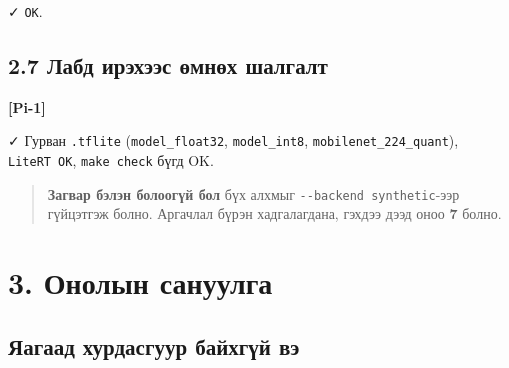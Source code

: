 ✓ \texttt{OK}.

\hypertarget{ux43bux430ux431ux434-ux438ux440ux44dux445ux44dux44dux441-ux4e9ux43cux43dux4e9ux445-ux448ux430ux43bux433ux430ux43bux442}{%
\subsection{2.7 Лабд ирэхээс өмнөх шалгалт}\label{ux43bux430ux431ux434-ux438ux440ux44dux445ux44dux44dux441-ux4e9ux43cux43dux4e9ux445-ux448ux430ux43bux433ux430ux43bux442}}

\textbf{{[}Pi-1{]}}

\begin{Shaded}
\begin{Highlighting}[]
  
\KeywordTok{\&\&} \KeywordTok{\&\&} \KeywordTok{\&\&} 
\end{Highlighting}
\end{Shaded}

✓ Гурван \texttt{.tflite} (\texttt{model\_float32}, \texttt{model\_int8}, \texttt{mobilenet\_\allowbreak{}224\_\allowbreak{}quant}), \texttt{LiteRT\ OK}, \texttt{make\ check} бүгд OK.

\begin{quote}
\textbf{Загвар бэлэн болоогүй бол} бүх алхмыг \texttt{-\/\allowbreak{}-backend\ synthetic}-ээр гүйцэтгэж болно. Аргачлал бүрэн хадгалагдана, гэхдээ дээд оноо \textbf{7} болно.
\end{quote}

\hypertarget{ux43eux43dux43eux43bux44bux43d-ux441ux430ux43dux443ux443ux43bux433ux430}{%
\section{3. Онолын сануулга}\label{ux43eux43dux43eux43bux44bux43d-ux441ux430ux43dux443ux443ux43bux433ux430}}

\hypertarget{ux44fux430ux433ux430ux430ux434-ux445ux443ux440ux434ux430ux441ux433ux443ux443ux440-ux431ux430ux439ux445ux433ux4afux439-ux432ux44d}{%
\subsection{Яагаад хурдасгуур байхгүй вэ}\label{ux44fux430ux433ux430ux430ux434-ux445ux443ux440ux434ux430ux441ux433ux443ux443ux440-ux431ux430ux439ux445ux433ux4afux439-ux432ux44d}}

